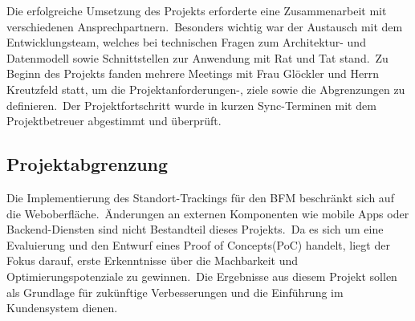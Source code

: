 Die erfolgreiche Umsetzung des Projekts erforderte eine Zusammenarbeit mit verschiedenen Ansprechpartnern.\ Besonders wichtig war der Austausch
mit dem Entwicklungsteam, welches bei technischen Fragen zum Architektur- und Datenmodell sowie Schnittstellen zur Anwendung mit Rat und Tat stand.\ Zu Beginn des Projekts fanden mehrere Meetings mit Frau Glöckler und Herrn Kreutzfeld statt,
um die Projektanforderungen-, ziele sowie die Abgrenzungen zu definieren.\ Der Projektfortschritt wurde in kurzen Sync-Terminen mit dem Projektbetreuer abgestimmt und überprüft.

\subsection{Projektabgrenzung} 
\label{subsec:Projektabgrenzung}

Die Implementierung des Standort-Trackings für den BFM beschränkt sich auf die Weboberfläche.\ Änderungen an externen Komponenten wie mobile Apps oder Backend-Diensten sind nicht Bestandteil dieses Projekts.\ Da es sich um eine Evaluierung und den Entwurf eines Proof of Concepts(PoC) handelt, liegt
der Fokus darauf, erste Erkenntnisse über die Machbarkeit und Optimierungspotenziale zu gewinnen.\ Die Ergebnisse aus diesem Projekt sollen als Grundlage für zukünftige Verbesserungen und die Einführung im Kundensystem dienen.